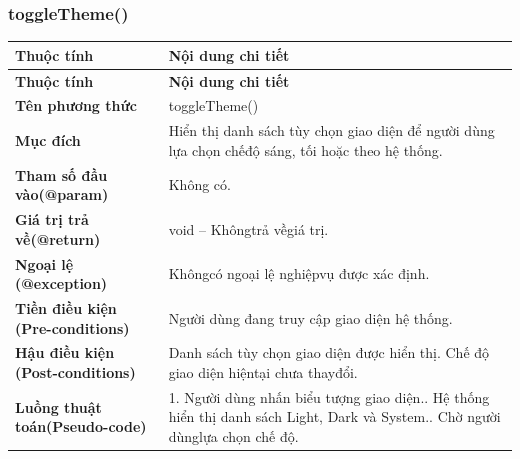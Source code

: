 \subsubsection{toggleTheme()}
\begin{longtable}{|L{0.24\textwidth}|L{0.70\textwidth}|}
\hline
\textbf{Thuộc tính} & \textbf{Nội dung chi tiết} \\
\hline
\endfirsthead
\hline
\textbf{Thuộc tính} & \textbf{Nội dung chi tiết} \\
\hline
\endhead
\textbf{Tên phương thức} & toggleTheme() \\
\hline
\textbf{Mục đích} & Hiển thị danh sách tùy chọn giao diện để người dùng lựa chọn chế\newline độ sáng, tối hoặc theo hệ thống. \\
\hline
\textbf{Tham số đầu vào}\newline \textbf{(@param)} & Không có. \\
\hline
\textbf{Giá trị trả về(@return)} & void – Khôngtrả vềgiá trị. \\
\hline
\textbf{Ngoại lệ (@exception)} & Khôngcó ngoại lệ nghiệpvụ được xác định. \\
\hline
\textbf{Tiền điều kiện (Pre-}\newline \textbf{conditions)} & Người dùng đang truy cập giao diện hệ thống. \\
\hline
\textbf{Hậu điều kiện (Post-}\newline \textbf{conditions)} & Danh sách tùy chọn giao diện được hiển thị. Chế độ giao diện hiện\newline tại chưa thayđổi. \\
\hline
\textbf{Luồng thuật toán}\newline \textbf{(Pseudo-code)} & 1. Người dùng nhấn biểu tượng giao diện.. Hệ thống hiển thị danh sách Light, Dark và System.. Chờ người dùnglựa chọn chế độ. \\
\hline
\end{longtable}
\vspace{-0.5\baselineskip}
